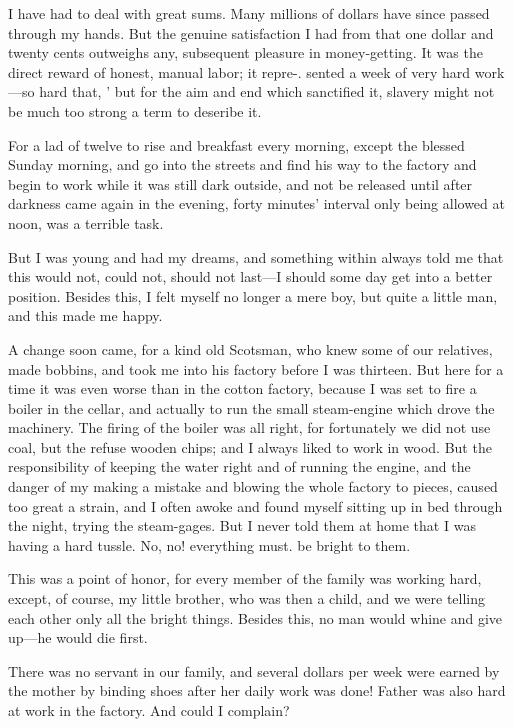 \documentclass[11pt,openany]{book}
\begin{document}
I have had to deal with great sums. Many millions of dollars have since passed through my hands. But the genuine satisfaction I had from that one dollar and twenty cents outweighs any, subsequent pleasure in money-getting. It was the direct reward of honest, manual labor; it repre-. sented a week of very hard work---so hard that, ' but for the aim and end which sanctified it, slavery might not be much too strong a term to deseribe it.

For a lad of twelve to rise and breakfast every morning, except the blessed Sunday morning, and go into the streets and find his way to the factory and begin to work while it was still dark outside, and not be released until after darkness came again in the evening, forty minutes' interval only being allowed at noon, was a terrible task.

But I was young and had my dreams, and something within always told me that this would not, could not, should not last---I should some day get into a better position. Besides this, I felt myself no longer a mere boy, but quite a little man, and this made me happy.

A change soon came, for a kind old Scotsman, who knew some of our relatives, made bobbins, and took me into his factory before I was thirteen. But here for a time it was even worse than in the cotton factory, because I was set to fire a boiler in the cellar, and actually to run the small steam-engine which drove the machinery. The firing of the boiler was all right, for fortunately we did not use coal, but the refuse wooden chips; and I always liked to work in wood. But the responsibility of keeping the water right and of running the engine, and the danger of my making a mistake and blowing the whole factory to pieces, caused too great a strain, and I often awoke and found myself sitting up in bed through the night, trying the steam-gages. But I never told them at home that I was having a hard tussle. No, no! everything must. be bright to them.

This was a point of honor, for every member of the family was working hard, except, of course, my little brother, who was then a child, and we were telling each other only all the bright things. Besides this, no man would whine and give up---he would die first.

There was no servant in our family, and several dollars per week were earned by the mother by binding shoes after her daily work was done! Father was also hard at work in the factory. And could I complain?
\end{document}
